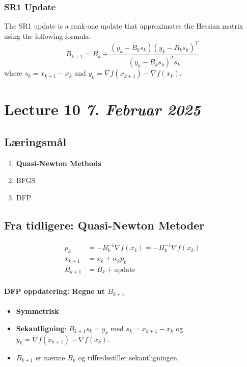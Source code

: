 \subsubsection*{SR1 Update}
The SR1 update is a rank-one update that approximates the Hessian matrix using the following formula:
\[
  B_{k+1} = B_k + \frac{(y_k - B_k s_k)(y_k - B_k s_k)^T}{(y_k - B_k s_k)^T s_k}
\]
where \( s_k = x_{k+1} - x_k \) and \( y_k = \nabla f(x_{k+1}) - \nabla f(x_k) \).

\clearpage

\section{Lecture 10 \emph{7. Februar 2025}}

\subsection*{Læringsmål}
\begin{enumerate}
  \item \textbf{Quasi-Newton Methods}
  \item BFGS
  \item DFP
\end{enumerate}

\subsection*{Fra tidligere: Quasi-Newton Metoder}
\begin{align*}
  p_k     & = -B_k^{-1} \nabla f(x_k) = -H_k^{-1} \nabla f(x_k) \\
  x_{k+1} & = x_k + \alpha_k p_k                                \\
  B_{k+1} & = B_k + \text{update}
\end{align*}

\paragraph{DFP oppdatering: Regne ut \(B_{k+1}\)}
\begin{itemize}
  \item \textbf{Symmetrisk}
  \item \textbf{Sekantligning}: \(B_{k+1} s_k = y_k\) med \(s_k = x_{k+1} - x_k\) og \(y_k = \nabla f(x_{k+1}) - \nabla f(x_k)\).
  \item \(B_{k+1}\) er nærme \(B_k\) og tilfredsstiller sekantligningen.
\end{itemize}

